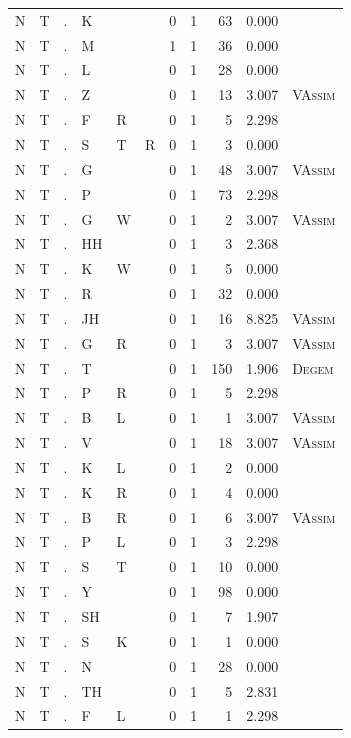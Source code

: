 \documentclass[12pt]{article}
\begin{document}
\begin{longtable}{r@{ } r@{ } c@{ } l@{ } l@{ } l@{ } r r r r l }
N & T & . & K &  &  & 0 & 1 & 63 & 0.000 &  \\
N & T & . & M &  &  & 1 & 1 & 36 & 0.000 &  \\
N & T & . & L &  &  & 0 & 1 & 28 & 0.000 &  \\
N & T & . & Z &  &  & 0 & 1 & 13 & 3.007 & \textsc{VAssim} \\
N & T & . & F & R &  & 0 & 1 & 5 & 2.298 &  \\
N & T & . & S & T & R & 0 & 1 & 3 & 0.000 &  \\
N & T & . & G &  &  & 0 & 1 & 48 & 3.007 & \textsc{VAssim} \\
N & T & . & P &  &  & 0 & 1 & 73 & 2.298 &  \\
N & T & . & G & W &  & 0 & 1 & 2 & 3.007 & \textsc{VAssim} \\
N & T & . & HH &  &  & 0 & 1 & 3 & 2.368 &  \\
N & T & . & K & W &  & 0 & 1 & 5 & 0.000 &  \\
N & T & . & R &  &  & 0 & 1 & 32 & 0.000 &  \\
N & T & . & JH &  &  & 0 & 1 & 16 & 8.825 & \textsc{VAssim} \\
N & T & . & G & R &  & 0 & 1 & 3 & 3.007 & \textsc{VAssim} \\
N & T & . & T &  &  & 0 & 1 & 150 & 1.906 & \textsc{Degem} \\
N & T & . & P & R &  & 0 & 1 & 5 & 2.298 &  \\
N & T & . & B & L &  & 0 & 1 & 1 & 3.007 & \textsc{VAssim} \\
N & T & . & V &  &  & 0 & 1 & 18 & 3.007 & \textsc{VAssim} \\
N & T & . & K & L &  & 0 & 1 & 2 & 0.000 &  \\
N & T & . & K & R &  & 0 & 1 & 4 & 0.000 &  \\
N & T & . & B & R &  & 0 & 1 & 6 & 3.007 & \textsc{VAssim} \\
N & T & . & P & L &  & 0 & 1 & 3 & 2.298 &  \\
N & T & . & S & T &  & 0 & 1 & 10 & 0.000 &  \\
N & T & . & Y &  &  & 0 & 1 & 98 & 0.000 &  \\
N & T & . & SH &  &  & 0 & 1 & 7 & 1.907 &  \\
N & T & . & S & K &  & 0 & 1 & 1 & 0.000 &  \\
N & T & . & N &  &  & 0 & 1 & 28 & 0.000 &  \\
N & T & . & TH &  &  & 0 & 1 & 5 & 2.831 &  \\
N & T & . & F & L &  & 0 & 1 & 1 & 2.298 &  \\

\end{longtable}
\end{document}

